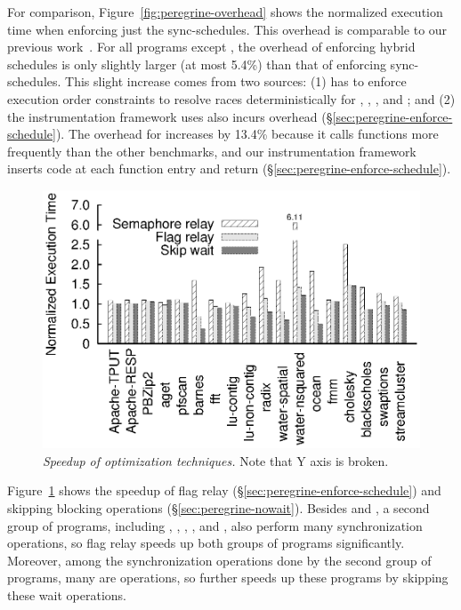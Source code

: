 For comparison, Figure~\ref{fig:peregrine-overhead} shows the normalized
execution time when enforcing just the sync-schedules.  This overhead is
comparable to our previous work~\cite{cui:tern:osdi10}.  For all
programs except \watern, the overhead of enforcing hybrid schedules is only slightly
larger (at most 5.4\%) than that of enforcing sync-schedules.
This slight increase comes from two sources: (1) \peregrine has to enforce
execution order constraints to resolve races deterministically for \pbzip,
 \barnes, \fft, and \lun; and (2) the instrumentation framework \peregrine uses
also incurs overhead (\S\ref{sec:peregrine-enforce-schedule}). 
The overhead for \watern increases by 13.4\% because it calls functions
more frequently than the other benchmarks, and our instrumentation framework
inserts code at each function entry and return
(\S\ref{sec:peregrine-enforce-schedule}).


\begin{figure}[b!]
\centering
\includegraphics[width=\columnwidth]{peregrine/figures/opt.eps}
\vspace{-.3in}
\caption{{\em Speedup of optimization techniques.} Note that Y axis is
  broken.} \label{fig:peregrine-opt}
\end{figure}

Figure~\ref{fig:peregrine-opt} shows the speedup of flag relay
(\S\ref{sec:peregrine-enforce-schedule}) and skipping blocking operations
(\S\ref{sec:peregrine-nowait}).  Besides \watern and \cholesky, a
second group of programs, including \barnes, \lun, \radix, \waters, and
\ocean, also perform many synchronization operations, so flag relay speeds up
both groups of programs significantly.  Moreover, among the
synchronization operations done by the second group of programs, many are
 operations, so \peregrine further speeds up these
programs by skipping these wait operations.



